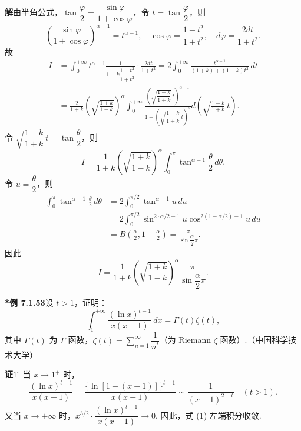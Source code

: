 \documentclass[UTF8, 12pt, fontset=fandol, oneside]{ctexart}
\begin{document}
\noindent\textbf{解}\quad 由半角公式，$\tan\dfrac\varphi2=\dfrac{\sin\varphi}{1+\cos\varphi}$，令 $t=\tan\dfrac\varphi2$，则
\[
\left(\frac{\sin\varphi}{1+\cos\varphi}\right)^{\alpha-1}=t^{\alpha-1},\quad
\cos\varphi=\frac{1-t^2}{1+t^2},\quad
d\varphi=\frac{2dt}{1+t^2}.
\]
故
\[
\begin{aligned}
I&=\int_0^{+\infty}t^{\alpha-1}\frac1{1+k\dfrac{1-t^2}{1+t^2}}\cdot\frac{2dt}{1+t^2}
=2\int_0^{+\infty}\frac{t^{\alpha-1}}{(1+k)+(1-k)t^2}\,dt\\
&=\frac2{1+k}\left(\sqrt{\frac{1+k}{1-k}}\right)^\alpha
\int_0^{+\infty}
\frac{\left(\sqrt{\dfrac{1-k}{1+k}}\,t\right)^{\alpha-1}}
{1+\left(\sqrt{\dfrac{1-k}{1+k}}\,t\right)^2}
d\left(\sqrt{\frac{1-k}{1+k}}\,t\right).
\end{aligned}
\tag{1}
\]
令 $\sqrt{\dfrac{1-k}{1+k}}\,t=\tan\dfrac\theta2$，则
\[
I=\frac1{1+k}\left(\sqrt{\frac{1+k}{1-k}}\right)^\alpha
\int_0^\pi\tan^{\alpha-1}\frac\theta2\,d\theta.
\tag{2}
\]
令 $u=\dfrac\theta2$，则
\[
\begin{aligned}
\int_0^\pi\tan^{\alpha-1}\frac\theta2\,d\theta
&=2\int_0^{\pi/2}\tan^{\alpha-1}u\,du\\
&=2\int_0^{\pi/2}\sin^{2\cdot\alpha/2-1}u\cos^{2(1-\alpha/2)-1}u\,du\\
&=B\left(\frac\alpha2,1-\frac\alpha2\right)
=\frac{\pi}{\sin\dfrac\alpha2\pi}.
\end{aligned}
\tag{3}
\]
因此
\[
I=\frac1{1+k}\left(\sqrt{\frac{1+k}{1-k}}\right)^\alpha
\frac{\pi}{\sin\dfrac\alpha2\pi}.
\]

\noindent\textbf{*例 7.1.53}\quad 设 $t>1$，证明：
\[
\int_1^{+\infty}\frac{(\ln x)^{t-1}}{x(x-1)}\,dx=\Gamma(t)\zeta(t),
\tag{1}
\]
其中 $\Gamma(t)$ 为 $\Gamma$ 函数，$\zeta(t)=\displaystyle\sum_{n=1}^{\infty}\dfrac1{n^t}$（为 Riemann $\zeta$ 函数）.（中国科学技术大学）

\noindent\textbf{证}\quad $1^\circ$ 当 $x\to1^+$ 时，
\[
\frac{(\ln x)^{t-1}}{x(x-1)}
=\frac{\{\ln[1+(x-1)]\}^{t-1}}{x(x-1)}
\sim\frac1{(x-1)^{2-t}}\quad(t>1).
\]
又当 $x\to+\infty$ 时，$x^{3/2}\cdot\dfrac{(\ln x)^{t-1}}{x(x-1)}\to0$. 因此，式 (1) 左端积分收敛.
\end{document}
